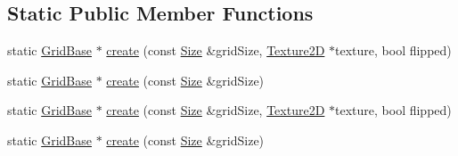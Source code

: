 \subsection*{Static Public Member Functions}
\begin{DoxyCompactItemize}
\item 
static \hyperlink{classGridBase}{Grid\+Base} $\ast$ \hyperlink{classGridBase_ad95df596c6e3b0c2b89bd5b6bf47f179}{create} (const \hyperlink{classSize}{Size} \&grid\+Size, \hyperlink{classTexture2D}{Texture2D} $\ast$texture, bool flipped)
\item 
static \hyperlink{classGridBase}{Grid\+Base} $\ast$ \hyperlink{classGridBase_ad3818fba4dd576b31ff621c3ab48be8a}{create} (const \hyperlink{classSize}{Size} \&grid\+Size)
\item 
static \hyperlink{classGridBase}{Grid\+Base} $\ast$ \hyperlink{classGridBase_a74286efd52e21f45ce6f6d14a966d56c}{create} (const \hyperlink{classSize}{Size} \&grid\+Size, \hyperlink{classTexture2D}{Texture2D} $\ast$texture, bool flipped)
\item 
static \hyperlink{classGridBase}{Grid\+Base} $\ast$ \hyperlink{classGridBase_a8a6fa690cb9544da4961653ecf72f1e2}{create} (const \hyperlink{classSize}{Size} \&grid\+Size)
\end{DoxyCompactItemize}

